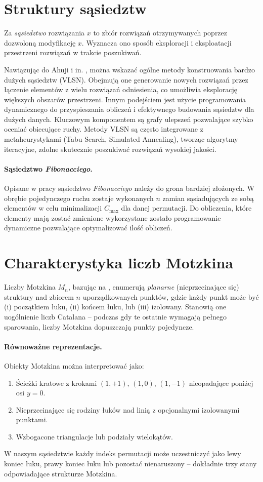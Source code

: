 \section{Struktury sąsiedztw}
Za \cite{vanlaarhoven1992} \emph{sąsiedztwo} rozwiązania \(x\) to zbiór rozwiązań otrzymywanych poprzez dozwoloną modyfikację \(x\). Wyznacza ono sposób eksploracji i eksploatacji przestrzeni rozwiązań w trakcie poszukiwań.

Nawiązując do Ahuji i in. \cite{ahuja2002,glover1997}, można wskazać ogólne metody konstruowania bardzo dużych sąsiedztw (VLSN). Obejmują one generowanie nowych rozwiązań przez łączenie elementów z wielu rozwiązań odniesienia, co umożliwia eksplorację większych obszarów przestrzeni. Innym podejściem jest użycie programowania dynamicznego do przyspieszania obliczeń i efektywnego budowania sąsiedztw dla dużych danych. Kluczowym komponentem są grafy ulepszeń pozwalające szybko oceniać obiecujące ruchy. Metody VLSN są często integrowane z metaheurystykami (Tabu Search, Simulated Annealing), tworząc algorytmy iteracyjne, zdolne skutecznie poszukiwać rozwiązań wysokiej jakości.
\paragraph{Sąsiedztwo \emph{Fibonacciego}.} Opisane w pracy \cite{Fibona} sąsiedztwo \emph{Fibonacciego} należy do grona bardziej złożonych. W obrębie pojedynczego ruchu zostaje wykonanych $n$ zamian sąsiadujących ze sobą elementów w celu minimalizacji $C_{\max}$ dla danej permutacji. Do obliczenia, które elementy mają zostać zmienione wykorzystane zostało programowanie dynamiczne pozwalające optymalizować ilość obliczeń.


\section{Charakterystyka liczb Motzkina}

Liczby Motzkina $M_n$, bazując na \cite{Motzkin_numbers}, enumerują \emph{planarne} (nieprzecinające się) struktury nad zbiorem $n$ uporządkowanych punktów, gdzie każdy punkt może być (i) początkiem łuku, (ii) końcem łuku, lub (iii) izolowany. Stanowią one uogólnienie liczb Catalana -- podczas gdy te ostatnie wymagają pełnego sparowania, liczby Motzkina dopuszczają punkty pojedyncze.

\paragraph{Równoważne reprezentacje.}
Obiekty Motzkina można interpretować jako:
\begin{enumerate}
  \item Ścieżki kratowe z krokami $(1,+1)$, $(1,0)$, $(1,-1)$ nieopadające poniżej osi $y=0$.
  \item Nieprzecinające się rodziny łuków nad linią z opcjonalnymi izolowanymi punktami.
  \item Wzbogacone triangulacje lub podziały wielokątów.
\end{enumerate}
W naszym sąsiedztwie każdy indeks permutacji może uczestniczyć jako lewy koniec łuku, prawy koniec łuku lub pozostać nienaruszony -- dokładnie trzy stany odpowiadające strukturze Motzkina.

